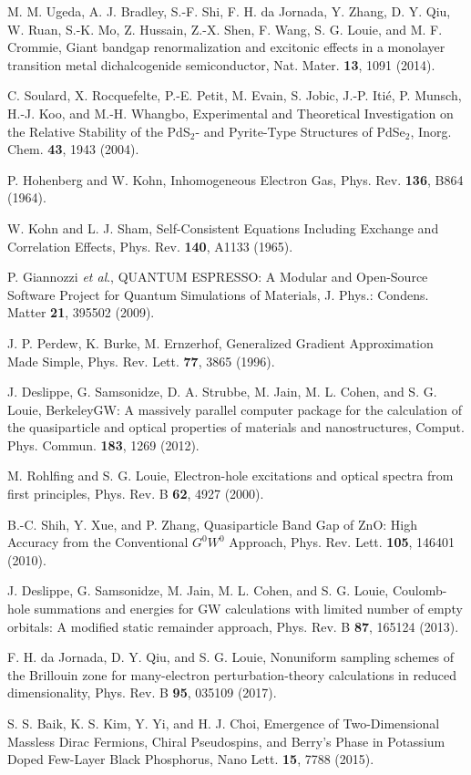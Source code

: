\documentclass[aps,prb,longbibliography,twocolumn]{revtex4-2}
\begin{document}
\begin{thebibliography}{11}
M. M. Ugeda, A. J. Bradley, S.-F. Shi, F. H. da Jornada, Y. Zhang, D. Y. Qiu, W. Ruan, S.-K. Mo, Z. Hussain, Z.-X. Shen, F. Wang, S. G. Louie, and M. F. Crommie, Giant bandgap renormalization and excitonic effects in a monolayer transition metal dichalcogenide semiconductor, Nat. Mater. {\bf 13}, 1091 (2014).

C. Soulard, X. Rocquefelte, P.-E. Petit, M. Evain, S. Jobic, J.-P. Iti\'e, P. Munsch, H.-J. Koo, and
M.-H. Whangbo, Experimental and Theoretical Investigation on the Relative Stability of
the PdS$_2$- and Pyrite-Type Structures of PdSe$_2$, Inorg. Chem. {\bf 43}, 1943 (2004).

P. Hohenberg and W. Kohn, Inhomogeneous Electron Gas, Phys. Rev. {\bf 136}, B864 (1964).

W. Kohn and L. J. Sham, Self-Consistent Equations Including Exchange and Correlation Effects, Phys. Rev. {\bf 140}, A1133 (1965).

P. Giannozzi {\em et al}., QUANTUM ESPRESSO: A Modular and Open-Source Software Project for Quantum Simulations of Materials, J. Phys.: Condens. Matter {\bf 21}, 395502 (2009).

J. P. Perdew, K. Burke, M. Ernzerhof, Generalized Gradient Approximation Made Simple, Phys. Rev. Lett. {\bf 77}, 3865 (1996).

J. Deslippe, G. Samsonidze, D. A. Strubbe, M. Jain, M. L. Cohen, and S. G. Louie, BerkeleyGW: A massively parallel computer package for the calculation of the quasiparticle and optical properties of materials and nanostructures, Comput. Phys. Commun. {\bf 183}, 1269 (2012).

M. Rohlfing and S. G. Louie, Electron-hole excitations and optical spectra from first principles, Phys. Rev. B {\bf 62}, 4927 (2000).

B.-C. Shih, Y. Xue, and P. Zhang, Quasiparticle Band Gap of ZnO: High Accuracy from the Conventional $G^0W^0$ Approach, Phys. Rev. Lett. {\bf 105}, 146401 (2010).

J. Deslippe, G. Samsonidze, M. Jain, M. L. Cohen, and S. G. Louie, Coulomb-hole summations and energies for GW calculations with limited number of empty orbitals: A modified static remainder approach, Phys. Rev. B {\bf 87}, 165124 (2013).

F. H. da Jornada, D. Y. Qiu, and S. G. Louie, Nonuniform sampling schemes of the Brillouin zone for many-electron perturbation-theory calculations in reduced dimensionality, Phys. Rev. B {\bf 95}, 035109 (2017).

S. S. Baik, K. S. Kim, Y. Yi, and H. J. Choi, Emergence of Two-Dimensional Massless Dirac Fermions, Chiral Pseudospins, and Berry's Phase in Potassium Doped Few-Layer Black Phosphorus, Nano Lett. {\bf 15}, 7788 (2015).

\end{thebibliography}
\end{document}
